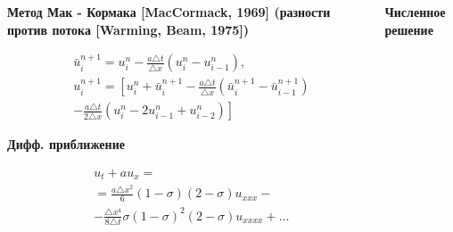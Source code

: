 \documentclass[10pt,xcolor=pst,aspectratio=169]{beamer}
\begin{document}
\begin{frame}{}

    \transdissolve[duration=0.1]
    \justifying
    \large


    \vspace{-15pt}

    \begin{columns}
        \begin{column}[T]{0.5\textwidth}
            \begin{center}
                \textbf{Метод Мак - Кормака [MacCormack, 1969] (разности против потока [Warming, Beam, 1975])}
            \end{center}
            \vspace{-10pt}
            \[
                \begin{split}
                    &\bar{u}^{n + 1}_{i} = u^{n}_{i} - \frac{a \triangle t}{\triangle x} (u^{n}_{i} - u^{n}_{i - 1}) , \\
                    &u^{n + 1}_{i} = \left[ u^{n}_{i} + \bar{u}^{n + 1}_{i} - \frac{a \triangle t}{\triangle x} (\bar{u}^{n + 1}_{i} - \bar{u}^{n + 1}_{i - 1}) \right. \\
                    &\left. - \frac{a \triangle t}{2 \triangle x} (u^{n}_{i} - 2 u^{n}_{i - 1} + u^{n}_{i - 2}) \right]
                \end{split}
            \]
            \vspace{-15pt}
            \begin{center}
                \textbf{Дифф. приближение}
            \end{center}
            \vspace{-10pt}
            \[
                \begin{split}
                    &u_{t} + a u_{x} =\\
                    &= \frac{a \triangle x^{2}}{6} (1 - \sigma) (2 - \sigma) \boxed{u_{xxx}} -\\
                    &- \frac{\triangle x^{4}}{8 \triangle t} \sigma (1 - \sigma)^{2} (2 - \sigma) \boxed{u_{xxxx}} + \ldots
                \end{split}
            \]
        \end{column}
        \begin{column}[T]{0.5\textwidth}
            \begin{center}
                \textbf{Численное решение}
            \end{center}
            \begin{center}
                 \begin{center}
                \end{center}
            \end{center}
        \end{column}
    \end{columns}


\end{frame}
\end{document}
